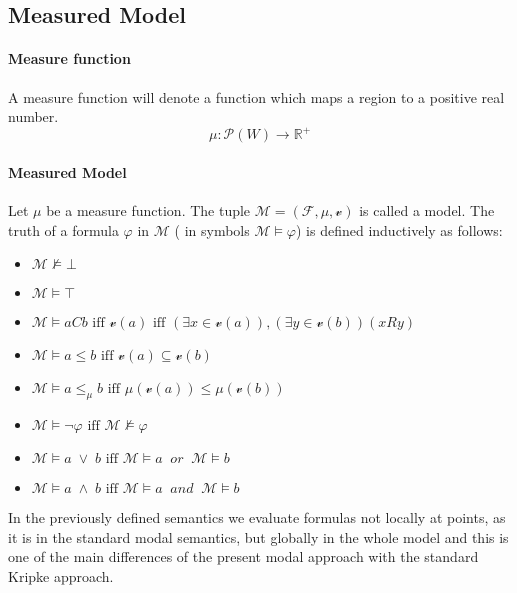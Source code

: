 \documentclass{article}
\begin{document}
	\subsection{Measured Model}

	\paragraph{Measure function} A measure function will denote a function which maps a region to a positive real number.
		\begin{equation*}
			\mu : \mathscr{P}(W) \longrightarrow \mathbb{R}^+
		\end{equation*}

	\paragraph{Measured Model}
		\label{measured-model} 
		Let $\mu$ be a measure function. The tuple $\mathcal{M} = (\mathcal{F}, \mu, \mathscr{v})$ is called a model. The truth of a formula $\varphi$ in $\mathcal{M}$ ( in symbols $\mathcal{M} \models \varphi$) is defined inductively as follows:
		\begin{itemize}
			\item $\mathcal{M} \not\models \bot$ 
			\item $\mathcal{M} \models \top$
			\item $\mathcal{M} \models aCb \text{ iff } \mathscr{v}(a) \text{ iff } (\exists x \in \mathscr{v}(a)), (\exists y \in \mathscr{v}(b)) (xRy)$
			\item $\mathcal{M} \models a \leq b \text{ iff } \mathscr{v}(a) \subseteq \mathscr{v}(b)$
			\item $\mathcal{M} \models a \leq_\mu b \text{ iff } \mu(\mathscr{v}(a)) \le \mu(\mathscr{v}(b))$
			\item $\mathcal{M} \models \neg \varphi \text{ iff } \mathcal{M} \not\models \varphi$
			\item $\mathcal{M} \models a \; \vee \; b \text{ iff } \mathcal{M} \models a \: \textit{ or } \: \mathcal{M} \models b$
			\item $\mathcal{M} \models a \; \wedge \; b \text{ iff } \mathcal{M} \models a \: \textit{ and } \: \mathcal{M} \models b$
		\end{itemize}
In the previously defined semantics we evaluate formulas not locally at points, as it is in the standard modal semantics, but globally in the whole model and this is one of the main differences of the present modal approach with the standard Kripke approach.
\end{document}
